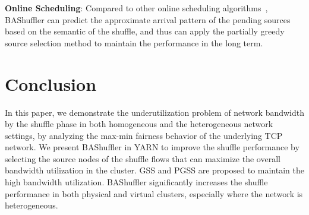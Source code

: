 \documentclass[10pt,journal,compsoc]{IEEEtran}
\begin{document}
\textbf{Online Scheduling}:
Compared to other online scheduling algorithms~\cite{wu2007scheduling,awerbuch1992competitive,borodin2005online,sgall1998line},
BAShuffler can predict the approximate arrival pattern of the pending
sources based on the semantic of the shuffle,
and thus can apply the partially greedy source selection method to
maintain the performance in the long term.

\section{Conclusion}\label{section:conclusion}
In this paper, we demonstrate the underutilization problem of network
bandwidth by the shuffle phase in both homogeneous and the heterogeneous
network settings, by analyzing the max-min fairness behavior of the
underlying TCP network.
We present BAShuffler in YARN to improve the shuffle performance by
selecting the source nodes of the shuffle flows that can
maximize the overall bandwidth utilization in the cluster. 
GSS and PGSS are proposed to maintain the high bandwidth utilization. 
BAShuffler significantly increases the shuffle performance in both
physical and virtual clusters, especially where the network is
heterogeneous.






%
%

\end{document}
